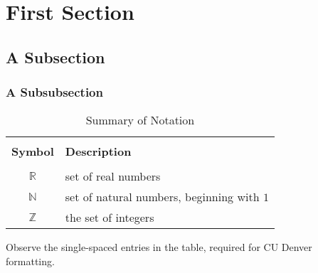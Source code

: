 \section{First Section}
\lipsum[1]

\subsection{A Subsection}
\lipsum[2]

\subsubsection{A Subsubsection}
\lipsum[3]

\lipsum[4]

\lipsum[5]



\begin{table}[h]
\caption{Summary of Notation}
\begin{tabular}{ c  l } 
 \hline
\\ \textbf{ Symbol} & \textbf{Description}  \\ [1ex] 
 \hline \\
 $\mathbb{R}$ & set of real numbers\\  [1ex]
 $\mathbb{N}$ & set of natural numbers, beginning with $1$\\  [1ex]
 $\mathbb{Z}$ & the set of integers\\  [1ex] 

\end{tabular}
\label{table:notations}
\end{table}

Observe the single-spaced entries in the table, required for CU Denver formatting.